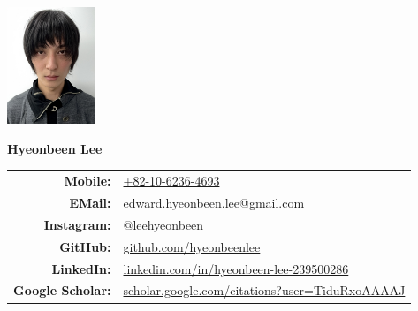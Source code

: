 \documentclass[a4paper,10pt]{extarticle}
\begin{document}
\pagestyle{empty}



\begin{minipage}{0.1\textwidth}
	\begin{flushleft}
		\includegraphics[height=3.5cm]{photo_dlicense.jpeg}
	\end{flushleft}
\end{minipage}
\hfill
\begin{minipage}{0.7\textwidth}
	\begin{flushright}
		\textbf{\Large Hyeonbeen Lee} %
		\newline\newline
		\begin{tabular}{rl}
			\textbf{Mobile: }         & \href{tel:+82-10-6236-4693}{+82-10-6236-4693}                                                                 \\
			\textbf{EMail: }          & \href{mailto:edward.hyeonbeen.lee@gmail.com}{edward.hyeonbeen.lee@gmail.com}                                  \\
			\textbf{Instagram: } & \href{https://www.instagram.com/leehyeonbeen}{@leehyeonbeen}                                         \\
			\textbf{GitHub: }         & \href{https://github.com/hyeonbeenlee}{github.com/hyeonbeenlee}                                               \\
			\textbf{LinkedIn: }       & \href{https://www.linkedin.com/in/hyeonbeen-lee-239500286/}{linkedin.com/in/hyeonbeen-lee-239500286}          \\
			\textbf{Google Scholar: } & \href{https://scholar.google.com/citations?user=TiduRxoAAAAJ}{scholar.google.com/citations?user=TiduRxoAAAAJ} \\
		\end{tabular}
	\end{flushright}

\end{minipage}
\end{document}
